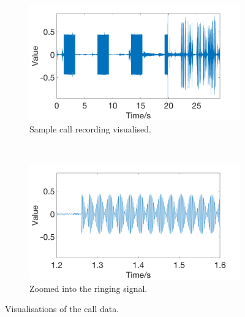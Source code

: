 \documentclass[main.tex]{subfiles}
\begin{document}
\begin{figure}[H]
	\captionsetup[subfigure]{position=b}
        \centering
        \begin{subfigure}{\textwidth}
                \includegraphics[width=\textwidth]{pics/wave1}
                \caption{Sample call recording visualised.}
                \label{fig:wave1}
        \end{subfigure}
        \\
        \begin{subfigure}{\textwidth}
                \includegraphics[width=\textwidth]{pics/wave2}
                \caption{Zoomed into the ringing signal.}
                \label{fig:wave2}
        \end{subfigure}
	\caption{Visualisations of the call data.}
	\label{fig:wave}
\end{figure}
\end{document}
